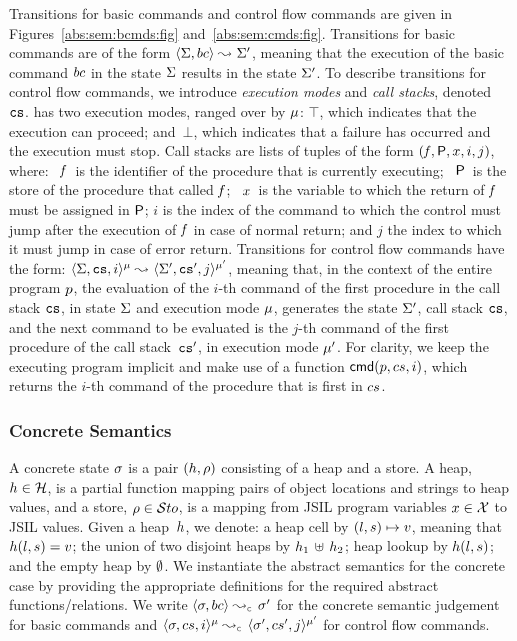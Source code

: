 Transitions for basic commands and control flow commands are given 
in Figures~\ref{abs:sem:bcmds:fig} and~\ref{abs:sem:cmds:fig}. Transitions for 
basic commands are of the form 
$\langle \Sigma, bc \rangle \leadsto_{} \Sigma'$, meaning that the execution of the basic command 
$bc$ in the state $\Sigma$ results in the state $\Sigma'$. 
%
To describe transitions for control flow commands, we introduce \emph{execution modes} and 
\emph{call stacks}, denoted~$\mathtt{cs}$.  \jsil has two execution modes, ranged over by $\mu$: 
$\top$, which indicates that the execution can proceed; and~$\bot$, which indicates that a failure 
has occurred and the execution must stop. Call stacks are lists of tuples of the form $(\mathit{f}, {\sf P}, x, i, j)$, where: 
~$\mathit{f}$~is the identifier of the procedure that is currently executing;
~${\sf P}$~is the store of the procedure that called $\mathit{f}$; 
~$x$~is the variable to which the return of $\mathit{f}$ must be assigned in ${\sf P}$; 
 $i$ is the index of the command to which the control must jump after the execution of $\mathit{f}$ in case of normal return; 
and  $j$ the index to which it must jump in case of error return. 
Transitions for control flow commands have the form:  $\langle \Sigma, \mathtt{cs}, i \rangle^{\mu} \leadsto_{} \langle \Sigma', \mathtt{cs}', j \rangle^{\mu'}$, 
meaning that, in the context of the entire program $p$, the evaluation of the $i$-th command of the first procedure in the 
call stack $\mathtt{cs}$, in state $\Sigma$ and execution mode $\mu$, generates 
the state $\Sigma'$, call stack $\mathtt{cs}$,  and the next command to be evaluated is the $j$-th command of the first procedure 
of the call stack~$\mathtt{cs}'$, in execution mode $\mu'$. 
For clarity, we keep the executing program implicit and make use of a function $\ccmd{\prog, \cs, i}$, which 
returns the $i$-th command of the procedure that is first in $cs$. %


\newpage
\subsubsection{Concrete Semantics}
A \jsil concrete state $\sigma$ is a pair $(h, \rho)$ consisting of a heap and a store. 
A heap, $h \in {\mathcal H}$, is a partial function mapping pairs of  object locations  and strings to heap values, 
and a store, $\rho \in \mathcal{S}to$, is a mapping from JSIL program variables $x \in \mathcal{X}$ to JSIL values. 
Given a heap~$h$, we denote: a heap cell by $(l, s) \mapsto v$, 
meaning that  $h(l,s) = v$; the union of two disjoint heaps by $h_1 \, \uplus \, h_2$; 
heap lookup by $h(l, s)$; and the empty heap by $\emptyset$.
We instantiate the abstract semantics for the concrete case by providing the appropriate definitions 
for the required abstract functions/relations. 
We write $\absbsemrule{\jstate, \bcmd}{\jstate'}{\concrete}$ for the concrete semantic 
judgement for basic commands and $\abssemrule{\jstate, \cs, i}{\jstate', \cs', j}{\mode}{\mode'}{\concrete}$ 
for control flow commands. 

